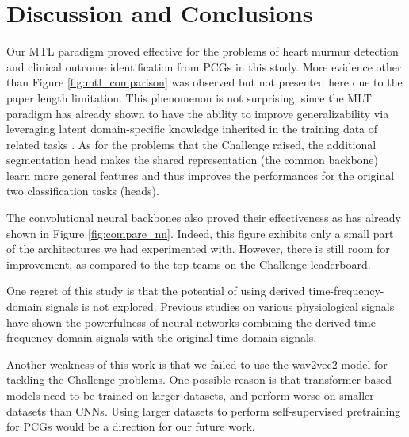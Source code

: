 \section{Discussion and Conclusions}
\label{sec:discu}

Our MTL paradigm proved effective for the problems of heart murmur detection and clinical outcome identification from PCGs in this study. More evidence other than Figure \ref{fig:mtl_comparison} was observed but not presented here due to the paper length limitation. This phenomenon is not surprising, since the MLT paradigm has already shown to have the ability to improve generalizability via leveraging latent domain-specific knowledge inherited in the training data of related tasks \cite{Caruana_1997_mtl}. As for the problems that the Challenge raised, the additional segmentation head makes the shared representation (the common backbone) learn more general features and thus improves the performances for the original two classification tasks (heads).

The convolutional neural backbones also proved their effectiveness as has already shown in Figure \ref{fig:compare_nn}. Indeed, this figure exhibits only a small part of the architectures we had experimented with. However, there is still room for improvement, as compared to the top teams on the Challenge leaderboard.

One regret of this study is that the potential of using derived time-frequency-domain signals is not explored. Previous studies on various physiological signals have shown the powerfulness of neural networks combining the derived time-frequency-domain signals with the original time-domain signals.

Another weakness of this work is that we failed to use the wav2vec2 model for tackling the Challenge problems. One possible reason is that transformer-based models need to be trained on larger datasets, and perform worse on smaller datasets than CNNs. Using larger datasets to perform self-supervised pretraining for PCGs would be a direction for our future work.
